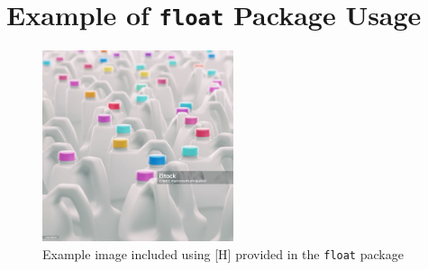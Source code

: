 \documentclass[]{article}
\begin{document}
\section{Example of \texttt{float} Package Usage}

\begin{figure}[H]
    \centering
    \includegraphics[width=0.5\textwidth]{assets/example-image.jpg}
    \caption{Example image included using [H] provided in the \texttt{float} package}
    \label{fig:graphicx-example}
\end{figure}

\end{document}
